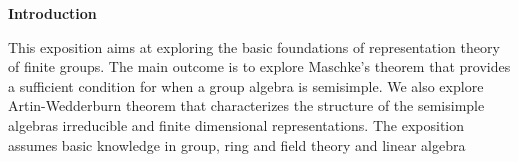 

\fancyhf{} %
\fancyhead[RO,R]{\thepage} %
\renewcommand{\headrulewidth}{0pt}

\begin{center}
    \Large
    \textbf{Introduction}
    
    \vspace{0.4cm}
    \large

\end{center}
This exposition aims at exploring the basic foundations of representation theory of finite groups. The main outcome is to explore Maschke's theorem that provides a sufficient condition for when a group algebra is semisimple. We also explore Artin-Wedderburn theorem that characterizes the structure of the semisimple algebras irreducible and finite dimensional representations. The exposition assumes basic knowledge in group, ring and field theory and linear algebra

